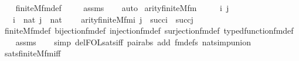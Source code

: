 \begin{isabellebody}
%
\isadelimproof
\ \ %
\endisadelimproof
%
\isatagproof
{}\isamarkupfalse%
\ finite{\isacharunderscore}{\kern0pt}M{\isacharunderscore}{\kern0pt}fm{\isacharunderscore}{\kern0pt}def\ \isanewline
\ \ \isamarkupfalse%
\ assms\isanewline
\ \ \isamarkupfalse%
\ auto%
\endisatagproof
{\isafoldproof}%
%
\isadelimproof
\isanewline
%
\endisadelimproof
\isanewline
{}\isamarkupfalse%
\ arity{\isacharunderscore}{\kern0pt}finite{\isacharunderscore}{\kern0pt}M{\isacharunderscore}{\kern0pt}fm\ {\isacharcolon}{\kern0pt}\ \isanewline
\ \ \ i\ j\ \isanewline
\ \ \ {\isachardoublequoteopen}i\ {\isasymin}\ nat{\isachardoublequoteclose}\ {\isachardoublequoteopen}j\ {\isasymin}\ nat{\isachardoublequoteclose}\ \isanewline
\ \ \ {\isachardoublequoteopen}arity{\isacharparenleft}{\kern0pt}finite{\isacharunderscore}{\kern0pt}M{\isacharunderscore}{\kern0pt}fm{\isacharparenleft}{\kern0pt}i{\isacharcomma}{\kern0pt}\ j{\isacharparenright}{\kern0pt}{\isacharparenright}{\kern0pt}\ {\isasymle}\ succ{\isacharparenleft}{\kern0pt}i{\isacharparenright}{\kern0pt}\ {\isasymunion}\ succ{\isacharparenleft}{\kern0pt}j{\isacharparenright}{\kern0pt}{\isachardoublequoteclose}\ \isanewline
%
\isadelimproof
\ \ %
\endisadelimproof
%
\isatagproof
{}\isamarkupfalse%
\ finite{\isacharunderscore}{\kern0pt}M{\isacharunderscore}{\kern0pt}fm{\isacharunderscore}{\kern0pt}def\ bijection{\isacharunderscore}{\kern0pt}fm{\isacharunderscore}{\kern0pt}def\ injection{\isacharunderscore}{\kern0pt}fm{\isacharunderscore}{\kern0pt}def\ surjection{\isacharunderscore}{\kern0pt}fm{\isacharunderscore}{\kern0pt}def\ typed{\isacharunderscore}{\kern0pt}function{\isacharunderscore}{\kern0pt}fm{\isacharunderscore}{\kern0pt}def\isanewline
\ \ \isamarkupfalse%
\ assms\isanewline
\ \ \isamarkupfalse%
\ {\isacharparenleft}{\kern0pt}simp\ del{\isacharcolon}{\kern0pt}FOL{\isacharunderscore}{\kern0pt}sats{\isacharunderscore}{\kern0pt}iff\ pair{\isacharunderscore}{\kern0pt}abs\ add{\isacharcolon}{\kern0pt}\ fm{\isacharunderscore}{\kern0pt}defs\ nat{\isacharunderscore}{\kern0pt}simp{\isacharunderscore}{\kern0pt}union{\isacharparenright}{\kern0pt}\isanewline
\ \ \isamarkupfalse%
%
\endisatagproof
{\isafoldproof}%
%
\isadelimproof
\isanewline
%
\endisadelimproof
\isanewline
{}\isamarkupfalse%
\ sats{\isacharunderscore}{\kern0pt}finite{\isacharunderscore}{\kern0pt}M{\isacharunderscore}{\kern0pt}fm{\isacharunderscore}{\kern0pt}iff\ {\isacharcolon}{\kern0pt}\ \isanewline

\end{isabellebody}
